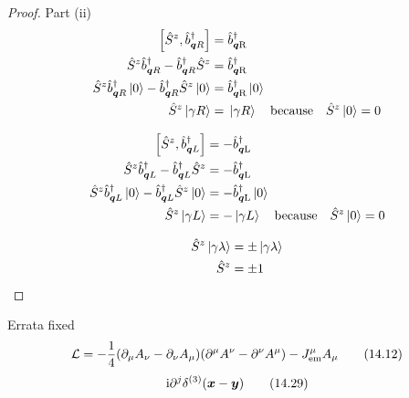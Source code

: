 \documentclass[letterpaper]{article}
\theoremstyle{definition}
\begin{document}
\begin{proof}Part (ii)
  \begin{align*}
    \bqty{\hat{S}^z,\hat{b}^\dagger_{\vb*{q}R}}                                             & =\hat{b}^\dagger_{\vb*{q}\text{R}}              \\
    \hat{S}^z\hat{b}^\dagger_{\vb*{q}R}-\hat{b}^\dagger_{\vb*{q}R}\hat{S}^z                 & =\hat{b}^\dagger_{\vb*{q}\text{R}}              \\
    \hat{S}^z\hat{b}^\dagger_{\vb*{q}R}\ket*{0}-\hat{b}^\dagger_{\vb*{q}R}\hat{S}^z\ket*{0} & =\hat{b}^\dagger_{\vb*{q}\text{R}}\ket*{0}      \\
    \hat{S}^z\ket*{\gamma R}                                                                & =\ket*{\gamma R}\qq{because}\hat{S}^z\ket*{0}=0 \\
  \end{align*}

  \begin{align*}
    \bqty{\hat{S}^z,\hat{b}^\dagger_{\vb*{q}L}}                                             & =-\hat{b}^\dagger_{\vb*{q}\text{L}}              \\
    \hat{S}^z\hat{b}^\dagger_{\vb*{q}L}-\hat{b}^\dagger_{\vb*{q}L}\hat{S}^z                 & =-\hat{b}^\dagger_{\vb*{q}\text{L}}              \\
    \hat{S}^z\hat{b}^\dagger_{\vb*{q}L}\ket*{0}-\hat{b}^\dagger_{\vb*{q}L}\hat{S}^z\ket*{0} & =-\hat{b}^\dagger_{\vb*{q}\text{L}}\ket*{0}      \\
    \hat{S}^z\ket*{\gamma L}                                                                & =-\ket*{\gamma L}\qq{because}\hat{S}^z\ket*{0}=0 \\
  \end{align*}

  \begin{align*}
    \hat{S}^z\ket*{\gamma \lambda} & =\pm\ket*{\gamma \lambda} \\
    \hat{S}^z                      & =\pm 1                    \\
  \end{align*}
\end{proof}

Errata fixed
\[\mathcal{L}=-\frac{1}{4}\pqty{\partial_\mu A_\nu-\partial_\nu A_\mu}\pqty{\partial^\mu A^\nu-\partial^\nu A^\mu}-J^\mu_{\text{em}}A_\mu \qquad(14.12)\]
\[\text{i}\partial^j\delta^{(3)}(\vb*{x}-\vb*{y}) \qquad(14.29)\]
\end{document}
